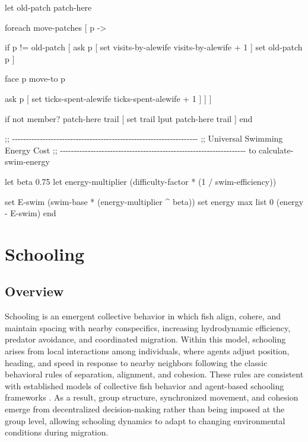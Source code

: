 \documentclass[
]{book}
\newenvironment{Shaded}{\begin{snugshade}}{\end{snugshade}}
\newcommand{\NormalTok}[1]{#1}
\begin{document}
\begin{Shaded}
\begin{Highlighting}[]
\NormalTok{    let old{-}patch patch{-}here}

\NormalTok{    foreach move{-}patches [ p {-}\textgreater{}}

\NormalTok{      if p != old{-}patch [}
\NormalTok{        ask p [ set visits{-}by{-}alewife visits{-}by{-}alewife + 1 ]}
\NormalTok{        set old{-}patch p}
\NormalTok{      ]}

\NormalTok{      face p}
\NormalTok{      move{-}to p}

\NormalTok{      ask p [}
\NormalTok{        set ticks{-}spent{-}alewife ticks{-}spent{-}alewife + 1}
\NormalTok{      ]}
\NormalTok{    ]}
\NormalTok{  ]}

\NormalTok{  if not member? patch{-}here trail [}
\NormalTok{    set trail lput patch{-}here trail}
\NormalTok{  ]}
\NormalTok{end}


\NormalTok{;; {-}{-}{-}{-}{-}{-}{-}{-}{-}{-}{-}{-}{-}{-}{-}{-}{-}{-}{-}{-}{-}{-}{-}{-}{-}{-}{-}{-}{-}{-}{-}{-}{-}{-}{-}{-}{-}{-}{-}{-}{-}{-}{-}{-}{-}{-}{-}{-}{-}{-}{-}{-}{-}{-}{-}{-}{-}{-}{-}{-}{-}{-}{-}{-}{-}{-}{-}}
\NormalTok{;;  Universal Swimming Energy Cost}
\NormalTok{;; {-}{-}{-}{-}{-}{-}{-}{-}{-}{-}{-}{-}{-}{-}{-}{-}{-}{-}{-}{-}{-}{-}{-}{-}{-}{-}{-}{-}{-}{-}{-}{-}{-}{-}{-}{-}{-}{-}{-}{-}{-}{-}{-}{-}{-}{-}{-}{-}{-}{-}{-}{-}{-}{-}{-}{-}{-}{-}{-}{-}{-}{-}{-}{-}{-}{-}{-}}
\NormalTok{to calculate{-}swim{-}energy}
  
\NormalTok{  let beta 0.75}
\NormalTok{  let energy{-}multiplier (difficulty{-}factor * (1 / swim{-}efficiency))}

\NormalTok{  set E{-}swim (swim{-}base * (energy{-}multiplier \^{} beta))}
\NormalTok{  set energy max list 0 (energy {-} E{-}swim)}
\NormalTok{end}
\end{Highlighting}
\end{Shaded}

\chapter{Schooling}\label{schooling}

\section{Overview}\label{overview-9}

Schooling is an emergent collective behavior in which fish align, cohere, and maintain spacing with nearby conspecifics, increasing hydrodynamic efficiency, predator avoidance, and coordinated migration. Within this model, schooling arises from local interactions among individuals, where agents adjust position, heading, and speed in response to nearby neighbors following the classic behavioral rules of separation, alignment, and cohesion. These rules are consistent with established models of collective fish behavior and agent-based schooling frameworks \citep{dobon_netlogo_2018, reynolds_flocks_1987}. As a result, group structure, synchronized movement, and cohesion emerge from decentralized decision-making rather than being imposed at the group level, allowing schooling dynamics to adapt to changing environmental conditions during migration.
\end{document}

